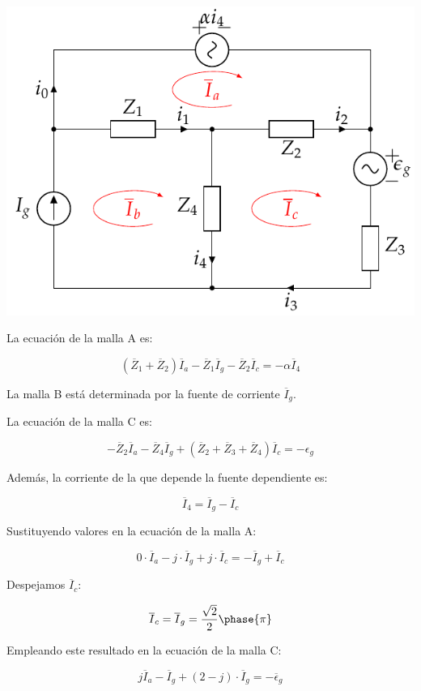\documentclass[12pt]{article}
\begin{document}
\begin{center}
  \includegraphics[height = 0.3\textheight]{figs/mallas_corrientes.pdf}
\end{center}

La ecuación de la malla A es:

\[
  (\overline{Z}_1 + \overline{Z}_2) \overline{I}_a - \overline{Z}_1 \overline{I}_g - \overline{Z}_2 \overline{I}_c = -\alpha \overline{I}_4
\]

La malla B está determinada por la fuente de corriente $\overline{I}_g$.

La ecuación de la malla C es:

\[
  - \overline{Z}_2 \overline{I}_a - \overline{Z}_4 \overline{I}_g + (\overline{Z}_2 + \overline{Z}_3 + \overline{Z}_4) \overline{I}_c = -\epsilon_g
\]

Además, la corriente de la que depende la fuente dependiente es:

\[
   \overline{I}_4 =  \overline{I}_g -  \overline{I}_c
 \]

 Sustituyendo valores en la ecuación de la malla A:


\[
  0 \cdot \overline{I}_a - j \cdot \overline{I}_g  + j \cdot \overline{I}_c = -\overline{I}_g + \overline{I}_c
\]

Despejamos $\overline{I}_c$:

\[
  \overline{I}_c = \overline{I}_g = \frac{\sqrt{2}}{2}\phase{\pi}
\]

Empleando este resultado en la ecuación de la malla C:

\[
  j \overline{I}_a - \overline{I}_g + (2 - j)\cdot \overline{I}_g = 
  - \overline{\epsilon}_g
\]
\end{document}
